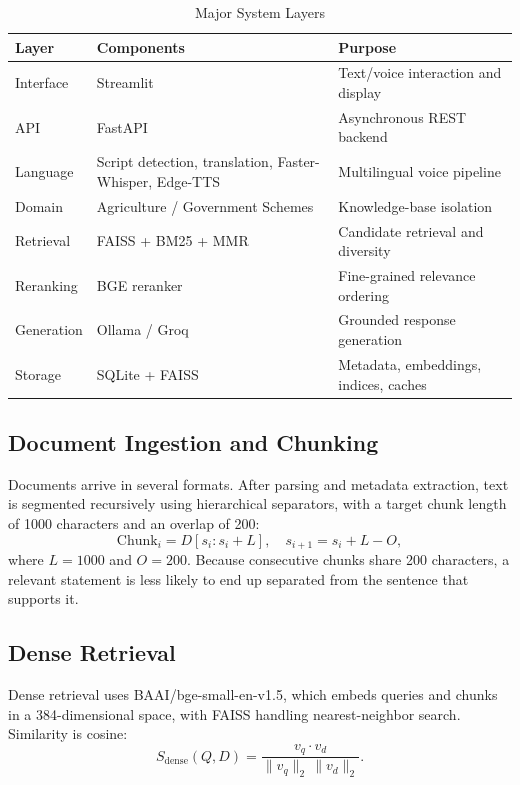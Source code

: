 \documentclass[10pt,twocolumn,letterpaper]{article}
\begin{document}
\begin{table}[t]
\caption{Major System Layers}
\label{tab:layers}
\centering
\footnotesize
\begin{tabular}{@{}p{1.1cm}p{3.0cm}p{3.1cm}@{}}
\toprule
\textbf{Layer} & \textbf{Components} & \textbf{Purpose} \\
\midrule
Interface & Streamlit & Text/voice interaction and display \\
API & FastAPI & Asynchronous REST backend \\
Language & Script detection, translation, Faster-Whisper, Edge-TTS & Multilingual voice pipeline \\
Domain & Agriculture / Government Schemes & Knowledge-base isolation \\
Retrieval & FAISS + BM25 + MMR & Candidate retrieval and diversity \\
Reranking & BGE reranker & Fine-grained relevance ordering \\
Generation & Ollama / Groq & Grounded response generation \\
Storage & SQLite + FAISS & Metadata, embeddings, indices, caches \\
\bottomrule
\end{tabular}
\end{table}

\subsection{Document Ingestion and Chunking}
Documents arrive in several formats. After parsing and metadata extraction, text is segmented recursively using hierarchical separators, with a target chunk length of 1000 characters and an overlap of 200:
\begin{equation}
\mathrm{Chunk}_i = D[s_i : s_i + L], \quad s_{i+1} = s_i + L - O,
\end{equation}
where $L = 1000$ and $O = 200$. Because consecutive chunks share 200 characters, a relevant statement is less likely to end up separated from the sentence that supports it.

\subsection{Dense Retrieval}
Dense retrieval uses BAAI/bge-small-en-v1.5, which embeds queries and chunks in a 384-dimensional space, with FAISS handling nearest-neighbor search. Similarity is cosine:
\begin{equation}
S_{\mathrm{dense}}(Q, D) = \frac{v_q \cdot v_d}{\lVert v_q \rVert_2 \, \lVert v_d \rVert_2}.
\end{equation}
\end{document}
